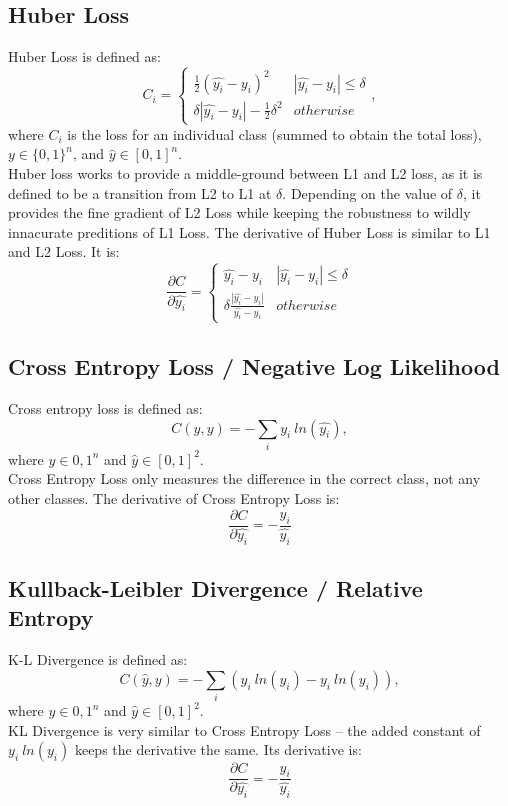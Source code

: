 \documentclass[fleqn]{article}
\begin{document}
\subsection{Huber Loss}
Huber Loss is defined as:
\[ C_i = \begin{cases} 
	\frac{1}{2}(\hat{y_i} - y_i)^2 & |\hat{y_i} - y_i| \leq \delta \\
    \delta |\hat{y_i} - y_i| - \frac{1}{2}\delta^2 & otherwise 
\end{cases}, \]
where $C_i$ is the loss for an individual class (summed to obtain the
total loss), $y \in \{0, 1\}^n$, and $\hat{y} \in [0, 1]^n$.\\
Huber loss works to provide a middle-ground between L1 and L2 loss, as it
is defined to be a transition from L2 to L1 at $\delta$.
Depending on the value of $\delta$, it provides the fine gradient of L2
Loss while keeping the robustness to wildly innacurate preditions of L1
Loss.
The derivative of Huber Loss is similar to L1 and L2 Loss. It is:
\[ \frac{\partial C}{\partial \hat{y_i}} = \begin{cases}
	\hat{y_i} - y_i & |\hat{y_i} - y_i| \leq \delta \\
	\delta \frac{|\hat{y_i} - y_i|}{\hat{y_i} - y_i} & otherwise
\end{cases} \]

\subsection{Cross Entropy Loss / Negative Log Likelihood}
Cross entropy loss is defined as:
\[ C(\hat{y}, y) = -{\sum}_i y_i \: ln(\hat{y_i}), \]
where $y \in {0, 1}^n$ and $\hat{y} \in [0, 1]^2$.\\
Cross Entropy Loss only measures the difference in the correct class, not
any other classes.
The derivative of Cross Entropy Loss is:
\[ \frac{\partial C}{\partial \hat{y_i}} = - \frac{y_i}{\hat{y_i}} \]

\subsection{Kullback-Leibler Divergence / Relative Entropy}
K-L Divergence is defined as:
\[ C(\hat{y}, y) = -{\sum}_i (y_i \: ln(\hat{y_i}) - y_i \: ln(y_i) ), \]
where $y \in {0, 1}^n$ and $\hat{y} \in [0, 1]^2$.\\
KL Divergence is very similar to Cross Entropy Loss -- the added constant
of $y_i \: ln(y_i)$ keeps the derivative the same.
Its derivative is:
\[ \frac{\partial C}{\partial \hat{y_i}} = - \frac{y_i}{\hat{y_i}} \]
\end{document}
